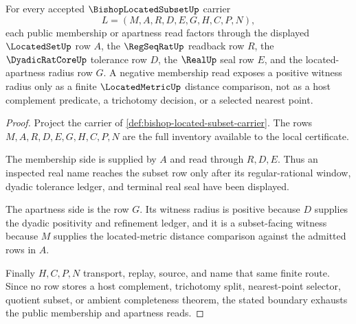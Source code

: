 \begin{theorem}
\label{thm:bishop-located-subset-membership-apartness}
For every accepted $\BishopLocatedSubsetUp$ carrier
$$
L=(M,A,R,D,E,G,H,C,P,N),
$$
each public membership or apartness read factors through the displayed $\LocatedSetUp$ row $A$, the $\RegSeqRatUp$ readback row $R$, the $\DyadicRatCoreUp$ tolerance row $D$, the $\RealUp$ seal row $E$, and the located-apartness radius row $G$. A negative membership read exposes a positive witness radius only as a finite $\LocatedMetricUp$ distance comparison, not as a host complement predicate, a trichotomy decision, or a selected nearest point.
\end{theorem}
\begin{proof}
Project the carrier of \autoref{def:bishop-located-subset-carrier}. The rows $M,A,R,D,E,G,H,C,P,N$ are the full inventory available to the local certificate.

The membership side is supplied by $A$ and read through $R,D,E$. Thus an inspected real name reaches the subset row only after its regular-rational window, dyadic tolerance ledger, and terminal real seal have been displayed.

The apartness side is the row $G$. Its witness radius is positive because $D$ supplies the dyadic positivity and refinement ledger, and it is a subset-facing witness because $M$ supplies the located-metric distance comparison against the admitted rows in $A$.

Finally $H,C,P,N$ transport, replay, source, and name that same finite route. Since no row stores a host complement, trichotomy split, nearest-point selector, quotient subset, or ambient completeness theorem, the stated boundary exhausts the public membership and apartness reads.
\end{proof}

